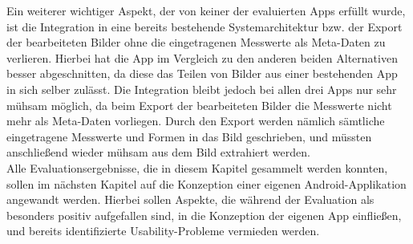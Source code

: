 Ein weiterer wichtiger Aspekt, der von keiner der evaluierten Apps erfüllt wurde, ist die Integration in eine bereits bestehende Systemarchitektur bzw. der Export der bearbeiteten Bilder ohne die eingetragenen Messwerte als Meta-Daten zu verlieren. 
Hierbei hat die App \im{} im Vergleich zu den anderen beiden Alternativen besser abgeschnitten, da diese das Teilen von Bilder aus einer bestehenden App in sich selber zulässt.
Die Integration bleibt jedoch bei allen drei Apps nur sehr mühsam möglich, da beim Export der bearbeiteten Bilder die Messwerte nicht mehr als Meta-Daten vorliegen.
Durch den Export werden nämlich sämtliche eingetragene Messwerte und Formen in das Bild geschrieben, und müssten anschließend wieder mühsam aus dem Bild extrahiert werden. \\

Alle Evaluationsergebnisse, die in diesem Kapitel gesammelt werden konnten, sollen im nächsten Kapitel auf die Konzeption einer eigenen Android-Applikation angewandt werden.
Hierbei sollen Aspekte, die während der Evaluation als besonders positiv aufgefallen sind, in die Konzeption der eigenen App einfließen, und bereits identifizierte Usability-Probleme vermieden werden.
